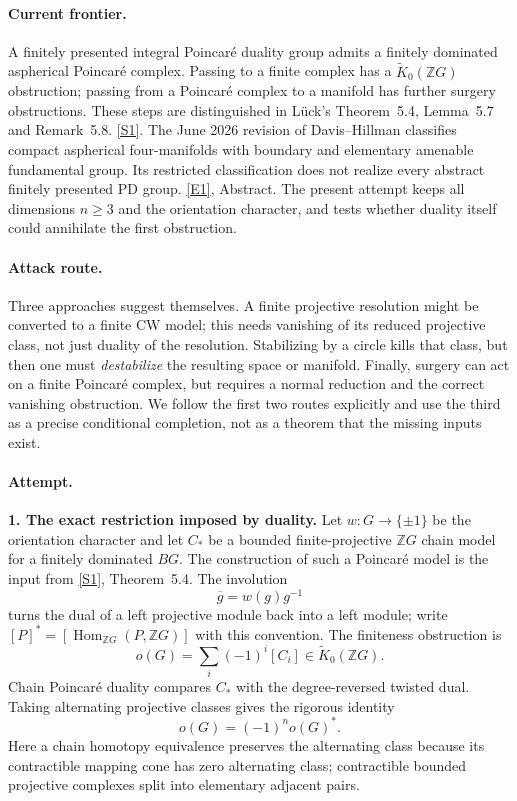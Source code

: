 \documentclass[11pt,a4paper]{article}
\newcommand{\Z}{\mathbb{Z}}
\newcommand{\sref}[2]{\hyperlink{source:#1:#2}{[S#2]}}
\newcommand{\eref}[2]{\hyperlink{extra:#1:#2}{[E#2]}}
\numberwithin{equation}{section}
\begin{document}
\paragraph{Current frontier.}
A finitely presented integral Poincar\'e duality group admits a finitely
dominated aspherical Poincar\'e complex. Passing to a finite complex has a
$\widetilde K_0(\Z G)$ obstruction; passing from a Poincar\'e complex to a
manifold has further surgery obstructions. These steps are distinguished
in L\"uck's Theorem~5.4, Lemma~5.7 and Remark~5.8.
\sref{221}{1}. The June 2026 revision of Davis--Hillman classifies
compact aspherical four-manifolds with boundary and elementary amenable
fundamental group. Its restricted classification does not realize every
abstract finitely presented PD group. \eref{221}{1}, Abstract.
The present attempt keeps all dimensions $n\ge3$ and the orientation
character, and tests whether duality itself could annihilate the first
obstruction.

\paragraph{Attack route.}
Three approaches suggest themselves. A finite projective resolution might
be converted to a finite CW model; this needs vanishing of its reduced
projective class, not just duality of the resolution. Stabilizing by a
circle kills that class, but then one must \emph{destabilize} the resulting
space or manifold. Finally, surgery can act on a finite Poincar\'e complex,
but requires a normal reduction and the correct vanishing obstruction.
We follow the first two routes explicitly and use the third as a precise
conditional completion, not as a theorem that the missing inputs exist.

\paragraph{Attempt.}
\textbf{1. The exact restriction imposed by duality.}
Let $w:G\to\{\pm1\}$ be the orientation character and let
$C_*$ be a bounded finite-projective $\Z G$ chain model for a finitely
dominated $BG$. The construction of such a Poincar\'e model is the input
from \sref{221}{1}, Theorem~5.4. The involution
\[
 \overline g=w(g)g^{-1}
\]
turns the dual of a left projective module back into a left module; write
$[P]^*=[\operatorname{Hom}_{\Z G}(P,\Z G)]$ with this convention.
The finiteness obstruction is
\[
 o(G)=\sum_i(-1)^i[C_i]\in\widetilde K_0(\Z G).
\]
Chain Poincar\'e duality compares $C_*$ with the degree-reversed twisted
dual. Taking alternating projective classes gives the rigorous identity
\begin{equation}\label{221:selfdual}
 o(G)=(-1)^n o(G)^*.
\end{equation}
Here a chain homotopy equivalence preserves the alternating class because
its contractible mapping cone has zero alternating class; contractible
bounded projective complexes split into elementary adjacent pairs.
\end{document}
